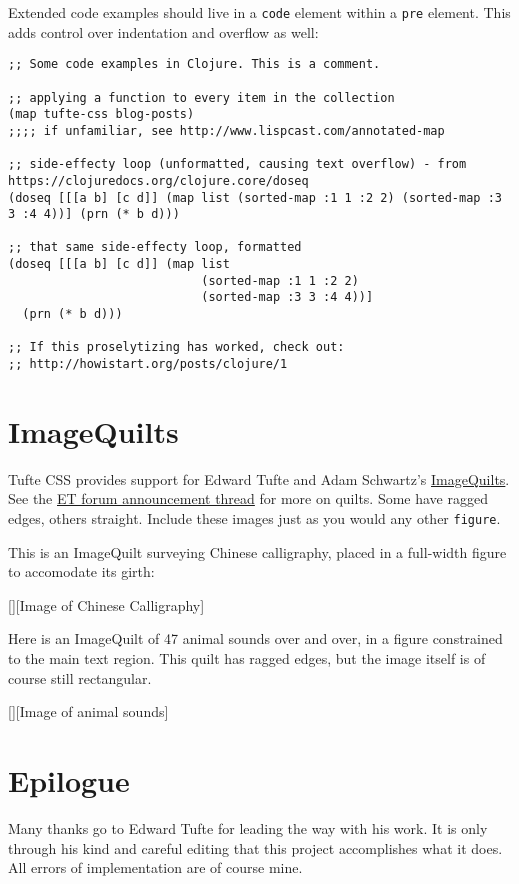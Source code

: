 \documentclass{article}
\begin{document}
Extended code examples should live in a \texttt{code} element within a \texttt{pre} element. This adds control over indentation and overflow as well:
\begin{verbatim}
;; Some code examples in Clojure. This is a comment.

;; applying a function to every item in the collection
(map tufte-css blog-posts)
;;;; if unfamiliar, see http://www.lispcast.com/annotated-map

;; side-effecty loop (unformatted, causing text overflow) - from https://clojuredocs.org/clojure.core/doseq
(doseq [[[a b] [c d]] (map list (sorted-map :1 1 :2 2) (sorted-map :3 3 :4 4))] (prn (* b d)))

;; that same side-effecty loop, formatted
(doseq [[[a b] [c d]] (map list
                           (sorted-map :1 1 :2 2)
                           (sorted-map :3 3 :4 4))]
  (prn (* b d)))

;; If this proselytizing has worked, check out:
;; http://howistart.org/posts/clojure/1
\end{verbatim}

\section{ImageQuilts}
Tufte CSS provides support for Edward Tufte and Adam Schwartz’s \href{http://imagequilts.com/}{ImageQuilts}. See the \href{http://www.edwardtufte.com/bboard/q-and-a-fetch-msg?msg\_id=0003wk}{ET forum announcement thread} for more on quilts. Some have ragged edges, others straight. Include these images just as you would any other \texttt{figure}.

This is an ImageQuilt surveying Chinese calligraphy, placed in a full-width figure to accomodate its girth:

[][Image of Chinese Calligraphy]

Here is an ImageQuilt of 47 animal sounds over and over, in a figure constrained to the main text region. This quilt has ragged edges, but the image itself is of course still rectangular.

[][Image of animal sounds]

\section{Epilogue}
Many thanks go to Edward Tufte for leading the way with his work. It is only through his kind and careful editing that this project accomplishes what it does. All errors of implementation are of course mine.
\end{document}
